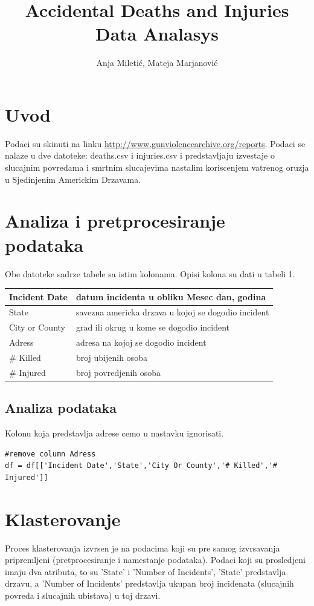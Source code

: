 \documentclass[11pt]{article} %
\title{Accidental Deaths and Injuries Data Analasys}
\author{Anja Miletić, Mateja Marjanović}
\begin{document}
\maketitle
\newpage

\doublespacing
\tableofcontents
\singlespacing
\newpage


\section{Uvod}
Podaci su skinuti na linku \url{http://www.gunviolencearchive.org/reports}. Podaci se nalaze u dve datoteke: deaths.csv i injuries.csv i predstavljaju izvestaje o 
slucajnim povredama i smrtnim slucajevima nastalim koriscenjem vatrenog oruzja u Sjedinjenim Americkim Drzavama. 

\section{Analiza i pretprocesiranje podataka}
Obe datoteke sadrze tabele sa istim kolonama. Opisi kolona su dati u tabeli 1.
\newline\newline
\begin{tabular}{|l|l|}
\hline
Incident Date & datum incidenta u obliku Mesec dan, godina \\
\hline
State & savezna americka drzava u kojoj se dogodio incident \\
\hline
City or County & grad ili okrug u kome se dogodio incident \\
\hline
Adress & adresa na kojoj se dogodio incident \\
\hline
\# Killed & broj ubijenih osoba \\
\hline
\# Injured & broj povredjenih osoba \\
\hline
\end{tabular}

\subsection{Analiza podataka}
Kolonu koja predstavlja adrese cemo u nastavku ignorisati. 
\begin{lstlisting}
#remove column Adress
df = df[['Incident Date','State','City Or County','# Killed','# Injured']]
\end{lstlisting}

	
	
	\newpage
	\section{Klasterovanje}
	Proces klasterovanja izvrsen je na podacima koji su pre samog izvrsavanja pripremljeni (pretprocesiranje i namestanje podataka). 
	Podaci koji su prosledjeni imaju dva atributa, to su 'State' i 'Number of Incidents', 'State' predstavlja drzavu, a 'Number of Incidents' predstavlja 
	ukupan broj incidenata (slucajnih povreda i slucajnih ubistava) u toj drzavi.
	
\end{document}
